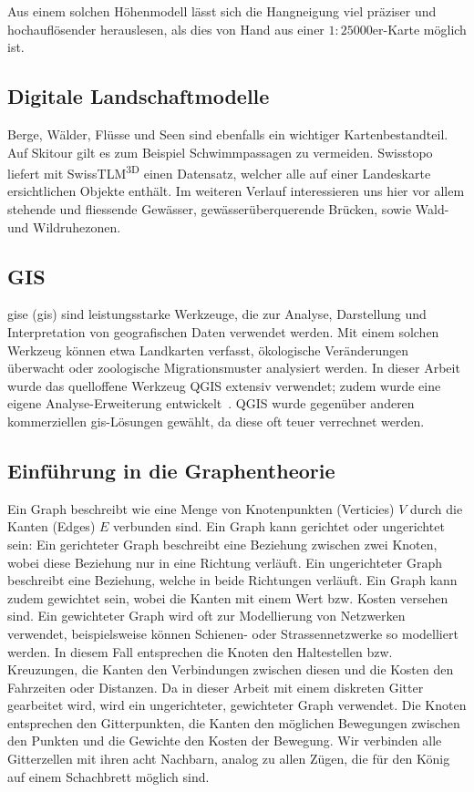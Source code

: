 Aus einem solchen Höhenmodell lässt sich die Hangneigung viel präziser und hochauflösender herauslesen, als dies von Hand aus einer $1:25000$er-Karte möglich ist.

\subsection{Digitale Landschaftmodelle}

Berge, Wälder, Flüsse und Seen sind ebenfalls ein wichtiger Kartenbestandteil. Auf Skitour gilt es zum Beispiel Schwimmpassagen zu vermeiden. Swisstopo liefert mit SwissTLM\textsuperscript{3D} einen Datensatz, welcher alle auf einer Landeskarte ersichtlichen Objekte enthält. Im weiteren Verlauf interessieren uns hier vor allem stehende und fliessende Gewässer, gewässerüberquerende Brücken, sowie Wald- und Wildruhezonen.

\subsection{GIS}\label{sec:gis}

\acrlong{gis}e (\acrshort{gis}) sind leistungsstarke Werkzeuge, die zur Analyse, Darstellung und Interpretation von geografischen Daten verwendet werden. Mit einem solchen Werkzeug können etwa Landkarten verfasst, ökologische Veränderungen überwacht oder zoologische Migrationsmuster analysiert werden.
In dieser Arbeit wurde das quelloffene Werkzeug QGIS extensiv verwendet; zudem wurde eine eigene Analyse-Erweiterung entwickelt~\cite{qgis}. QGIS wurde gegenüber anderen kommerziellen \acrshort{gis}-Lösungen gewählt, da diese oft teuer verrechnet werden.

\subsection{Einführung in die Graphentheorie}

Ein Graph beschreibt wie eine Menge von Knotenpunkten (Verticies) $V$ durch die Kanten (Edges) $E$ verbunden sind. Ein Graph kann gerichtet oder ungerichtet sein: Ein gerichteter Graph beschreibt eine Beziehung zwischen zwei Knoten, wobei diese Beziehung nur in eine Richtung verläuft. Ein ungerichteter Graph beschreibt eine Beziehung, welche in beide Richtungen verläuft. Ein Graph kann zudem gewichtet sein, wobei die Kanten mit einem Wert bzw. Kosten versehen sind. Ein gewichteter Graph wird oft zur Modellierung von Netzwerken verwendet, beispielsweise können Schienen- oder Strassennetzwerke so modelliert werden. In diesem Fall entsprechen die Knoten den Haltestellen bzw. Kreuzungen, die Kanten den Verbindungen zwischen diesen und die Kosten den Fahrzeiten oder Distanzen. 
Da in dieser Arbeit mit einem diskreten Gitter gearbeitet wird, wird ein ungerichteter, gewichteter Graph verwendet. Die Knoten entsprechen den Gitterpunkten, die Kanten den möglichen Bewegungen zwischen den Punkten und die Gewichte den Kosten der Bewegung. Wir verbinden alle Gitterzellen mit ihren acht Nachbarn, analog zu allen Zügen, die für den König auf einem Schachbrett möglich sind.


